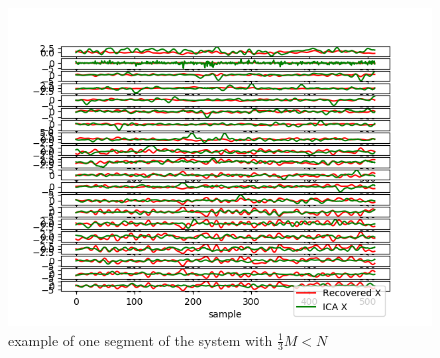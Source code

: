 \begin{figure}[H]
    \centering
	\includegraphics[scale=0.5]{figures/ch_7/M__N_2.png}
	\caption{example of one segment of the system with $\frac{1}{3} M<N$}
	\label{fig:M<N_2}
\end{figure} 